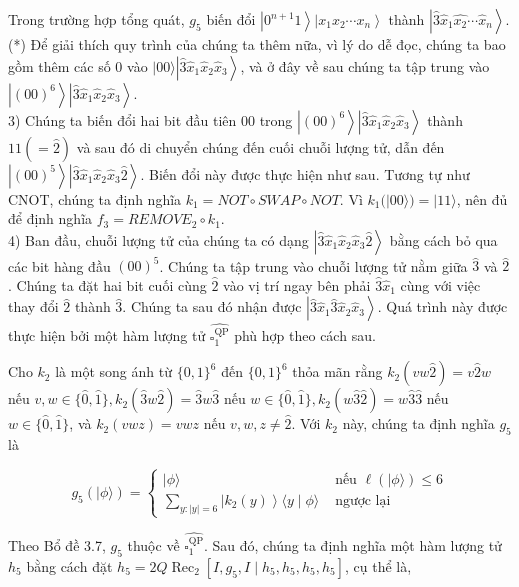\documentclass[10pt]{article}
\begin{document}
Trong trường hợp tổng quát, $g_{5}$ biến đổi $\left|0^{n+1} 1\right\rangle\left|x_{1} x_{2} \cdots x_{n}\right\rangle$ thành $\left|\hat{3} \hat{x}_{1} \hat{x_{2}} \cdots \hat{x}_{n}\right\rangle$.\\
(*) Để giải thích quy trình của chúng ta thêm nữa, vì lý do dễ đọc, chúng ta bao gồm thêm các số 0 vào $|00\rangle\left|\hat{3} \hat{x}_{1} \hat{x}_{2} \hat{x}_{3}\right\rangle$, và ở đây về sau chúng ta tập trung vào $\left|(00)^{6}\right\rangle\left|\hat{3} \hat{x}_{1} \hat{x}_{2} \hat{x}_{3}\right\rangle$.\\
3) Chúng ta biến đổi hai bit đầu tiên 00 trong $\left|(00)^{6}\right\rangle\left|\hat{3} \hat{x}_{1} \hat{x}_{2} \hat{x}_{3}\right\rangle$ thành $11(=\hat{2})$ và sau đó di chuyển chúng đến cuối chuỗi lượng tử, dẫn đến $\left|(00)^{5}\right\rangle\left|\hat{3} \hat{x}_{1} \hat{x}_{2} \hat{x}_{3} \hat{2}\right\rangle$. Biến đổi này được thực hiện như sau. Tương tự như CNOT, chúng ta định nghĩa $k_{1}=N O T \circ S W A P \circ N O T$. Vì $k_{1}(|00\rangle)=|11\rangle$, nên đủ để định nghĩa $f_{3}=R E M O V E_{2} \circ k_{1}$.\\
4) Ban đầu, chuỗi lượng tử của chúng ta có dạng $\left|\hat{3} \hat{x}_{1} \hat{x}_{2} \hat{x}_{3} \hat{2}\right\rangle$ bằng cách bỏ qua các bit hàng đầu $(00)^{5}$. Chúng ta tập trung vào chuỗi lượng tử nằm giữa $\hat{3}$ và $\hat{2}$. Chúng ta đặt hai bit cuối cùng $\hat{2}$ vào vị trí ngay bên phải $\hat{3} \hat{x}_{1}$ cùng với việc thay đổi $\hat{2}$ thành $\hat{3}$. Chúng ta sau đó nhận được $\left|\hat{3} \hat{x}_{1} \hat{3} \hat{x}_{2} \hat{x}_{3}\right\rangle$. Quá trình này được thực hiện bởi một hàm lượng tử $\widehat{\square_{1}^{\mathrm{QP}}}$ phù hợp theo cách sau.

Cho $k_{2}$ là một song ánh từ $\{0,1\}^{6}$ đến $\{0,1\}^{6}$ thỏa mãn rằng $k_{2}(v w \hat{2})=v \hat{2} w$ nếu $v, w \in\{\hat{0}, \hat{1}\}, k_{2}(\hat{3} w \hat{2})= \hat{3} w \hat{3}$ nếu $w \in\{\hat{0}, \hat{1}\}, k_{2}(w \hat{3} \hat{2})=w \hat{3} \hat{3}$ nếu $w \in\{\hat{0}, \hat{1}\}$, và $k_{2}(v w z)=v w z$ nếu $v, w, z \neq \hat{2}$. Với $k_{2}$ này, chúng ta định nghĩa $g_{5}$ là

$$
g_{5}(|\phi\rangle)= \begin{cases}|\phi\rangle & \text { nếu } \ell(|\phi\rangle) \leq 6 \\ \sum_{y:|y|=6}\left|k_{2}(y)\right\rangle\langle y \mid \phi\rangle & \text { ngược lại }\end{cases}
$$

Theo Bổ đề 3.7, $g_{5}$ thuộc về $\widehat{\square_{1}^{\mathrm{QP}}}$. Sau đó, chúng ta định nghĩa một hàm lượng tử $h_{5}$ bằng cách đặt $h_{5}= 2 Q \operatorname{Rec}_{2}\left[I, g_{5}, I \mid h_{5}, h_{5}, h_{5}, h_{5}\right]$, cụ thể là,
\end{document}
